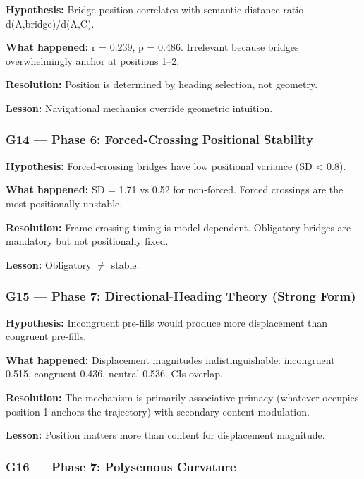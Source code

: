 \textbf{Hypothesis:} Bridge position correlates with semantic distance ratio d(A,bridge)/d(A,C).

\textbf{What happened:} r = 0.239, p = 0.486. Irrelevant because bridges overwhelmingly anchor at positions 1--2.

\textbf{Resolution:} Position is determined by heading selection, not geometry.

\textbf{Lesson:} Navigational mechanics override geometric intuition.

\subsubsection{G14 --- Phase 6: Forced-Crossing Positional Stability}\label{g14-phase-6-forced-crossing-positional-stability}

\textbf{Hypothesis:} Forced-crossing bridges have low positional variance (SD \textless{} 0.8).

\textbf{What happened:} SD = 1.71 vs 0.52 for non-forced. Forced crossings are the most positionally unstable.

\textbf{Resolution:} Frame-crossing timing is model-dependent. Obligatory bridges are mandatory but not positionally fixed.

\textbf{Lesson:} Obligatory \(\neq\) stable.

\subsubsection{G15 --- Phase 7: Directional-Heading Theory (Strong Form)}\label{g15-phase-7-directional-heading-theory-strong-form}

\textbf{Hypothesis:} Incongruent pre-fills would produce more displacement than congruent pre-fills.

\textbf{What happened:} Displacement magnitudes indistinguishable: incongruent 0.515, congruent 0.436, neutral 0.536. CIs overlap.

\textbf{Resolution:} The mechanism is primarily associative primacy (whatever occupies position 1 anchors the trajectory) with secondary content modulation.

\textbf{Lesson:} Position matters more than content for displacement magnitude.

\subsubsection{G16 --- Phase 7: Polysemous Curvature}\label{g16-phase-7-polysemous-curvature}

